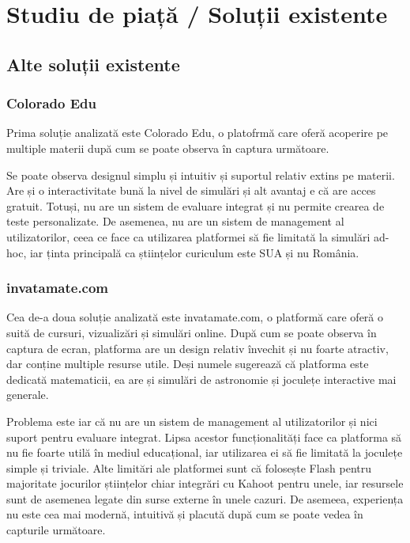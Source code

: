 \chapter{Studiu de piață / Soluții existente}
\label{chapter:studiuPiata}

\section{Alte soluții existente}
\label{sec:proj}
\subsection{Colorado Edu}

Prima soluție analizată este Colorado Edu, o platofrmă care oferă acoperire pe multiple materii după cum se poate observa în captura
următoare.


Se poate observa designul simplu și intuitiv și suportul relativ extins pe materii. Are și o interactivitate bună la nivel de simulări și alt 
avantaj e că are acces gratuit. Totuși, nu are un sistem de evaluare integrat și nu permite crearea de teste personalizate. De asemenea, nu are
un sistem de management al utilizatorilor, ceea ce face ca utilizarea platformei să fie limitată la simulări ad-hoc, iar ținta principală ca științelor
curiculum este SUA și nu România.

\subsection{invatamate.com}



Cea de-a doua soluție analizată este invatamate.com, o platformă care oferă o suită de cursuri, vizualizări și simulări online.
După cum se poate observa în captura de ecran, platforma are un design relativ învechit și nu foarte atractiv, dar
conține multiple resurse utile. Deși numele sugerează că platforma este dedicată matematicii, ea are și simulări de astronomie
și joculețe interactive mai generale.


Problema este iar că nu are un sistem de management al utilizatorilor și nici suport pentru evaluare integrat.
Lipsa acestor funcționalități face ca platforma să nu fie foarte utilă în mediul educațional, iar utilizarea ei să fie limitată 
la joculețe simple și triviale. Alte limitări ale platformei sunt că folosește Flash pentru majoritate jocurilor științelor
chiar integrări cu Kahoot pentru unele, iar resursele sunt de asemenea legate din surse externe în unele cazuri.
De asemeea, experiența nu este cea mai modernă, intuitivă și placută după cum se poate vedea în capturile următoare.

